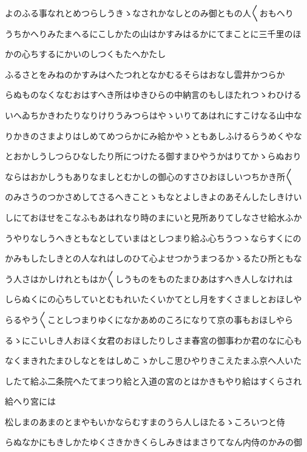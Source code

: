 \documentclass[a4paper,11pt,landscape]{ltjtarticle}
\begin{document}
よのふる事なれとめつらしうきゝなされかなしとのみ御ともの人〱おもへり
\par\medskip
うちかへりみたまへるにこしかたの山はかすみはるかにてまことに三千里のほ
\par\medskip
かの心ちするにかいのしつくもたへかたし
\par\medskip
ふるさとをみねのかすみはへたつれとなかむるそらはおなし雲井かつらか
\par\medskip
らぬものなくなむおはすへき所はゆきひらの中納言のもしほたれつゝわひける
\par\medskip
いへゐちかきわたりなりけりうみつらはやゝいりてあはれにすこけなる山中な
\par\medskip
りかきのさまよりはしめてめつらかにみ給かやゝともあしふけるらうめくやな
\par\medskip
とおかしうしつらひなしたり所につけたる御すまひやうかはりてかゝらぬおり
\par\medskip
ならはおかしうもありなましとむかしの御心のすさひおほしいつちかき所〱
\par\medskip
のみさうのつかさめしてさるへきことゝもなとよしきよのあそんしたしきけい
\par\medskip
しにておほせをこなふもあはれなり時のまにいと見所ありてしなさせ給水ふか
\par\medskip
うやりなしうへきともなとしていまはとしつまり給ふ心ちうつゝならすくにの
\par\medskip
かみもしたしきとの人なれはしのひて心よせつかうまつるかゝるたひ所ともな
\par\medskip
う人さはかしけれともはか〱しうものをものたまひあはすへき人しなけれは
\par\medskip
しらぬくにの心ちしていとむもれいたくいかてとし月をすくさましとおほしや
\par\medskip
らるやう〱ことしつまりゆくになかあめのころになりて京の事もおほしやら
\par\medskip
るゝにこいしき人おほく女君のおほしたりしさま春宮の御事わか君のなに心も
\par\medskip
なくまきれたまひしなとをはしめこゝかしこ思ひやりきこえたまふ京へ人いた
\par\medskip
したて給ふ二条院へたてまつり給と入道の宮のとはかきもやり給はすくらされ
\par\medskip
給へり宮には
\par\medskip
松しまのあまのとまやもいかならむすまのうら人しほたるゝころいつと侍
\par\medskip
らぬなかにもきしかたゆくさきかきくらしみきはまさりてなん内侍のかみの御
\par\medskip
\end{document}
